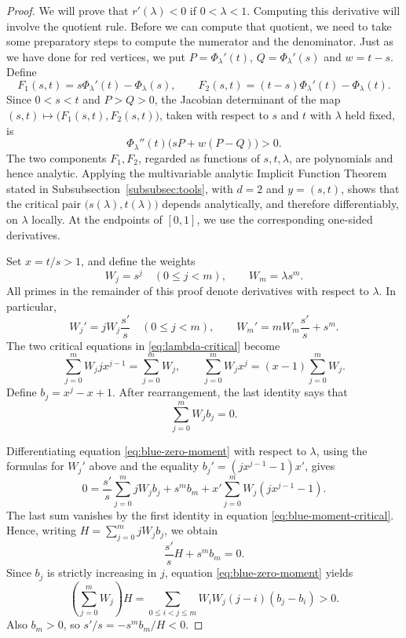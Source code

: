 \documentclass[10pt,a4paper]{amsart}
\theoremstyle{remark}
\begin{document}
\begin{proof}
We will prove that $r'(\lambda) <0$  if $0< \lambda <1$. Computing this derivative will involve the quotient rule. Before we can compute that quotient, we need to take some preparatory steps to compute the numerator and the denominator. 
Just as we have done for red vertices,  we put $P=\Phi_\lambda'(t)$, $Q=\Phi_\lambda'(s)$ and $w=t-s$.
Define
\[
F_1(s,t)=s\Phi_\lambda'(t)-\Phi_\lambda(s),
\qquad
F_2(s,t)=(t-s)\Phi_\lambda'(t)-\Phi_\lambda(t).
\]
Since $0<s<t$ and $P>Q>0$, the Jacobian determinant of the map
$(s,t)\mapsto \big(F_1(s,t),F_2(s,t)\big)$, taken with respect to $s$ and $t$
with $\lambda$ held fixed, is
\[
\Phi_\lambda''(t)\bigl(sP+w(P-Q)\bigr)>0.
\]
The two components $F_1,F_2$, regarded as functions of $s,t,\lambda$,
are polynomials and hence analytic. Applying the multivariable analytic
Implicit Function Theorem stated in Subsubsection~\ref{subsubsec:tools},
with $d=2$ and $y=(s,t)$, shows that the critical pair
$\big(s(\lambda),t(\lambda)\big)$ depends analytically, and therefore
differentiably, on $\lambda$ locally. At the endpoints of $[0,1]$,
we use the corresponding one-sided derivatives.

Set $x=t/s>1$, and define the weights
\[
W_j=s^j\quad(0\leq j<m),\qquad W_m=\lambda s^m.
\]
All primes in the remainder of this proof denote derivatives with respect
to $\lambda$. In particular,
\[
W_j'=jW_j\frac{s'}s\quad(0\leq j<m),
\qquad
W_m'=mW_m\frac{s'}s+s^m.
\]
The two critical equations in \eqref{eq:lambda-critical} become
\begin{equation}\label{eq:blue-moment-critical}
\sum_{j=0}^m W_j jx^{j-1}=\sum_{j=0}^m W_j,
\qquad
\sum_{j=0}^m W_j x^j=(x-1)\sum_{j=0}^m W_j.
\end{equation}
Define $b_j=x^j-x+1$. After rearrangement, the last identity says that
\begin{equation}\label{eq:blue-zero-moment}
\sum_{j=0}^m W_jb_j=0.
\end{equation}


Differentiating equation \eqref{eq:blue-zero-moment} with respect to
$\lambda$, using the formulas for $W_j'$ above and the equality
$b_j'=(jx^{j-1}-1)x'$, gives
\[
0=\frac{s'}s\sum_{j=0}^m jW_jb_j+s^m b_m
+x'\sum_{j=0}^m W_j(jx^{j-1}-1).
\]
The last sum vanishes by the first identity in equation
\eqref{eq:blue-moment-critical}. Hence, writing
$H=\sum_{j=0}^m jW_jb_j$, we obtain
\[
\frac{s'}s H+s^m b_m=0.
\]
Since $b_j$ is strictly increasing in $j$, equation
\eqref{eq:blue-zero-moment} yields
\[
\left(\sum_{j=0}^m W_j\right)H
=\sum_{0\leq i<j\leq m}W_iW_j(j-i)(b_j-b_i)>0.
\]
Also $b_m>0$, so $s'/s=-s^m b_m/H<0$.



\end{proof}
\end{document}
